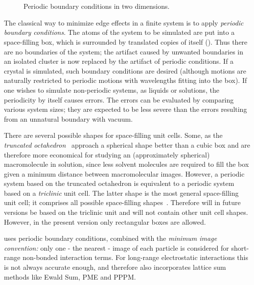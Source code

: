 \section{}
\label{sec:pbc}
\begin{figure}
\centerline{}
\caption {Periodic boundary conditions in two dimensions.}
\label{fig:pbc}
\end{figure}
The classical way to minimize edge effects in a finite system is to
apply {\em periodic boundary conditions}. The atoms of the system to be simulated are put into a space-filling box, which is
surrounded by translated copies of itself (). 
Thus there are no
boundaries of the system; the artifact caused by unwanted
boundaries in an isolated cluster is now replaced by the artifact of
periodic conditions. If a crystal is simulated, such boundary conditions
are desired (although motions are naturally restricted to periodic
motions with wavelengths fitting into the box). If one wishes to
simulate  non-periodic systems, as liquids or solutions, the
periodicity by  itself causes errors. The errors can be evaluated by
comparing various system sizes; they are expected to be less severe than
the errors resulting from an unnatural boundary with vacuum.

There are several possible shapes for space-filling unit cells. Some,
as the {\em truncated octahedron}~\cite{Adams79} approach a spherical
shape better than a cubic box and are therefore more economical for
studying an (approximately spherical) macromolecule in solution, since
less solvent molecules are required to fill the box given a minimum
distance between macromolecular images. However, a periodic system
based on the truncated octahedron is equivalent to a periodic system
based on a {\em triclinic} unit cell. The latter shape is the most
general space-filling unit cell; it comprises all possible
space-filling shapes~\cite{Bekker95}. Therefore {\gromacs} will in
future versions be based on the triclinic unit and will not contain
other unit cell shapes. However, in the present version
only rectangular boxes are allowed.
  
{\gromacs} uses periodic boundary conditions, combined with the {\em
minimum image convention:} only one - the nearest - image of each
particle is considered for short-range non-bonded interaction terms.
For long-range electrostatic interactions this is not always accurate
enough, and {\gromacs} therefore also incorporates lattice sum methods
like Ewald Sum, PME and PPPM.
  
